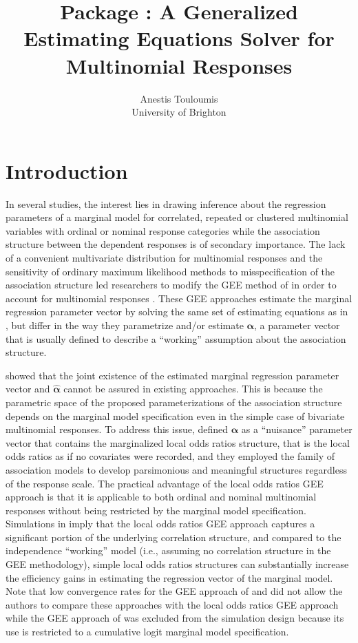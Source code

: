 \documentclass[
]{jss}
\author{
Anestis Touloumis\\University of Brighton
}
\title{\proglang{R} Package \pkg{multgee}: A Generalized Estimating
Equations Solver for Multinomial Responses}
\begin{document}
\hypertarget{introduction}{%
\section{Introduction}\label{introduction}}

In several studies, the interest lies in drawing inference about the
regression parameters of a marginal model for correlated, repeated or
clustered multinomial variables with ordinal or nominal response
categories while the association structure between the dependent
responses is of secondary importance. The lack of a convenient
multivariate distribution for multinomial responses and the sensitivity
of ordinary maximum likelihood methods to misspecification of the
association structure led researchers to modify the GEE method of
\citet{Liang1986} in order to account for multinomial responses
\citep{Miller1993, Lipsitz1994, Williamson1995, Lumley1996, Heagerty1996, Parsons2006}.
These GEE approaches estimate the marginal regression parameter vector
by solving the same set of estimating equations as in \citet{Liang1986},
but differ in the way they parametrize and/or estimate
\(\boldsymbol \alpha\), a parameter vector that is usually defined to
describe a ``working'' assumption about the association structure.

\citet{Touloumis2012} showed that the joint existence of the estimated
marginal regression parameter vector and \(\hat{\boldsymbol \alpha}\)
cannot be assured in existing approaches. This is because the parametric
space of the proposed parameterizations of the association structure
depends on the marginal model specification even in the simple case of
bivariate multinomial responses. To address this issue,
\citet{Touloumis2012} defined \(\boldsymbol \alpha\) as a ``nuisance''
parameter vector that contains the marginalized local odds ratios
structure, that is the local odds ratios as if no covariates were
recorded, and they employed the family of association models
\citep{Goodman1985} to develop parsimonious and meaningful structures
regardless of the response scale. The practical advantage of the local
odds ratios GEE approach is that it is applicable to both ordinal and
nominal multinomial responses without being restricted by the marginal
model specification. Simulations in \citet{Touloumis2012} imply that the
local odds ratios GEE approach captures a significant portion of the
underlying correlation structure, and compared to the independence
``working'' model (i.e., assuming no correlation structure in the GEE
methodology), simple local odds ratios structures can substantially
increase the efficiency gains in estimating the regression vector of the
marginal model. Note that low convergence rates for the GEE approach of
\citet{Lipsitz1994} and \citet{Heagerty1996} did not allow the authors
to compare these approaches with the local odds ratios GEE approach
while the GEE approach of \citet{Parsons2006} was excluded from the
simulation design because its use is restricted to a cumulative logit
marginal model specification.
\end{document}
